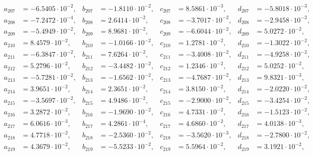 \begin{align*}
  a_{ 207 } &= -6.5405 \cdot 10^{ -2 }, & b_{ 207 } &= -1.8110 \cdot 10^{ -2 }, & c_{ 207 } &= 8.5861 \cdot 10^{ -3 }, & d_{ 207 } &= -5.8018 \cdot 10^{ -3 }, \\ 
  a_{ 208 } &= -7.2472 \cdot 10^{ -4 }, & b_{ 208 } &= 2.6414 \cdot 10^{ -2 }, & c_{ 208 } &= -3.7017 \cdot 10^{ -2 }, & d_{ 208 } &= -2.9458 \cdot 10^{ -2 }, \\ 
  a_{ 209 } &= -5.4949 \cdot 10^{ -2 }, & b_{ 209 } &= 8.9681 \cdot 10^{ -2 }, & c_{ 209 } &= -6.6044 \cdot 10^{ -2 }, & d_{ 209 } &= 5.0272 \cdot 10^{ -2 }, \\ 
  a_{ 210 } &= 8.4579 \cdot 10^{ -2 }, & b_{ 210 } &= -1.0166 \cdot 10^{ -2 }, & c_{ 210 } &= 1.2781 \cdot 10^{ -2 }, & d_{ 210 } &= -1.3022 \cdot 10^{ -2 }, \\ 
  a_{ 211 } &= -6.3847 \cdot 10^{ -2 }, & b_{ 211 } &= 7.6264 \cdot 10^{ -2 }, & c_{ 211 } &= -3.4008 \cdot 10^{ -2 }, & d_{ 211 } &= -4.9258 \cdot 10^{ -2 }, \\ 
  a_{ 212 } &= 5.2796 \cdot 10^{ -2 }, & b_{ 212 } &= -3.4482 \cdot 10^{ -2 }, & c_{ 212 } &= 1.2346 \cdot 10^{ -2 }, & d_{ 212 } &= 5.0252 \cdot 10^{ -2 }, \\ 
  a_{ 213 } &= -5.7281 \cdot 10^{ -2 }, & b_{ 213 } &= -1.6562 \cdot 10^{ -2 }, & c_{ 213 } &= -4.7687 \cdot 10^{ -2 }, & d_{ 213 } &= 9.8321 \cdot 10^{ -3 }, \\ 
  a_{ 214 } &= 3.9651 \cdot 10^{ -2 }, & b_{ 214 } &= 2.3651 \cdot 10^{ -2 }, & c_{ 214 } &= 3.8150 \cdot 10^{ -2 }, & d_{ 214 } &= -2.0220 \cdot 10^{ -2 }, \\ 
  a_{ 215 } &= -3.5697 \cdot 10^{ -2 }, & b_{ 215 } &= 4.9486 \cdot 10^{ -2 }, & c_{ 215 } &= -2.9000 \cdot 10^{ -2 }, & d_{ 215 } &= -3.4254 \cdot 10^{ -2 }, \\ 
  a_{ 216 } &= 3.2872 \cdot 10^{ -2 }, & b_{ 216 } &= -1.9690 \cdot 10^{ -2 }, & c_{ 216 } &= 4.7331 \cdot 10^{ -2 }, & d_{ 216 } &= -1.5123 \cdot 10^{ -2 }, \\ 
  a_{ 217 } &= 6.0616 \cdot 10^{ -3 }, & b_{ 217 } &= 4.2861 \cdot 10^{ -4 }, & c_{ 217 } &= 4.6860 \cdot 10^{ -2 }, & d_{ 217 } &= 4.0138 \cdot 10^{ -3 }, \\ 
  a_{ 218 } &= 4.7718 \cdot 10^{ -2 }, & b_{ 218 } &= -2.5360 \cdot 10^{ -2 }, & c_{ 218 } &= -3.5620 \cdot 10^{ -3 }, & d_{ 218 } &= -2.7800 \cdot 10^{ -2 }, \\ 
  a_{ 219 } &= 4.3679 \cdot 10^{ -2 }, & b_{ 219 } &= -5.5233 \cdot 10^{ -2 }, & c_{ 219 } &= 5.5964 \cdot 10^{ -2 }, & d_{ 219 } &= 3.1921 \cdot 10^{ -2 }, \\ 

\end{align*}
